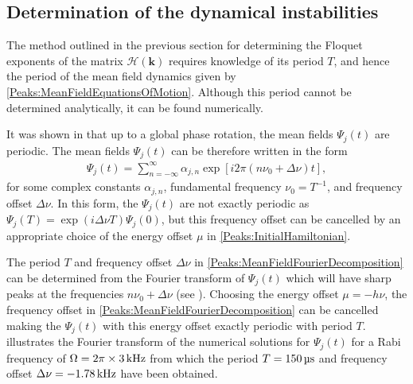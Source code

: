 \subsection{Determination of the dynamical instabilities}
\label{Peaks:ExperimentEigenvalues}

The method outlined in the previous section for determining the Floquet exponents of the matrix $\mathcal{H}(\bm{k})$ requires knowledge of its period $T$, and hence the period of the mean field dynamics given by \eqref{Peaks:MeanFieldEquationsOfMotion}. Although this period cannot be determined analytically, it can be found numerically.

It was shown in  that up to a global phase rotation, the mean fields $\Psi_j(t)$ are periodic. The mean fields $\Psi_j(t)$ can be therefore written in the form
\begin{align}
    \label{Peaks:MeanFieldFourierDecomposition}
    \Psi_j(t) = \sum_{n=-\infty}^\infty \alpha_{j,n} \exp\left[i 2\pi \left( n \nu_0 + \Delta\nu\right)t \right],
\end{align}
for some complex constants $\alpha_{j, n}$, fundamental frequency $\nu_0 = T^{-1}$, and frequency offset $\Delta \nu$. In this form, the $\Psi_j(t)$ are not exactly periodic as $\Psi_j(T) = \exp(i\Delta \nu T)\Psi_j(0)$, but this frequency offset can be cancelled by an appropriate choice of the energy offset $\mu$ in \eqref{Peaks:InitialHamiltonian}.

The period $T$ and frequency offset $\Delta\nu$ in \eqref{Peaks:MeanFieldFourierDecomposition} can be determined from the Fourier transform of $\Psi_j(t)$ which will have sharp peaks at the frequencies $n \nu_0 + \Delta \nu$ (see ). Choosing the energy offset $\mu=-h \nu$, the frequency offset in \eqref{Peaks:MeanFieldFourierDecomposition} can be cancelled making the $\Psi_j(t)$ with this energy offset exactly periodic with period $T$.  illustrates the Fourier transform of the numerical solutions for $\Psi_j(t)$ for a Rabi frequency of $\Omega = 2 \pi \times \unit[3]{kHz}$ from which the period $T=\unit[150]{\micro{}s}$ and frequency offset $\Delta \nu = \unit[-1.78]{kHz}$ have been obtained.

